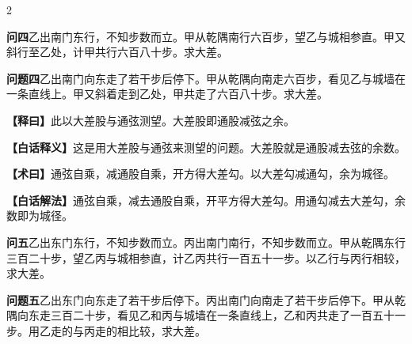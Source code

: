 \documentclass[11pt,a4paper]{article}
\newcommand{\WenQuestion}[1]{\textbf{\textcolor{classicalcolor}{#1}}}
\newcommand{\BaiQuestion}[1]{\textbf{\textcolor{moderncolor}{#1}}}
\newcommand{\WenExplain}{\textcolor{classicalcolor}{\textbf{【释曰】}}}
\newcommand{\BaiExplain}{\textcolor{moderncolor}{\textbf{【白话释义】}}}
\newcommand{\WenMethod}{\textcolor{classicalcolor}{\textbf{【术曰】}}}
\newcommand{\BaiMethod}{\textcolor{moderncolor}{\textbf{【白话解法】}}}
\begin{document}
\vspace{0.5em}

\begin{paracol}{2}

\switchcolumn*
\begin{tcolorbox}[colback=red!3,colframe=red!30!black,boxrule=0.3pt]
\WenQuestion{问四}\quad 乙出南门东行，不知步数而立。甲从乾隅南行六百步，望乙与城相参直。甲又斜行至乙处，计甲共行六百八十步。求大差。
\end{tcolorbox}
\switchcolumn
\begin{tcolorbox}[colback=blue!3,colframe=blue!30!black,boxrule=0.3pt]
\BaiQuestion{问题四}\quad 乙出南门向东走了若干步后停下。甲从乾隅向南走六百步，看见乙与城墙在一条直线上。甲又斜着走到乙处，甲共走了六百八十步。求大差。
\end{tcolorbox}

\switchcolumn*
\begin{tcolorbox}[colback=red!5,colframe=red!30!black,boxrule=0.3pt]
\WenExplain\quad 此以大差股与通弦测望。大差股即通股减弦之余。
\end{tcolorbox}
\switchcolumn
\begin{tcolorbox}[colback=blue!5,colframe=blue!30!black,boxrule=0.3pt]
\BaiExplain\quad 这是用大差股与通弦来测望的问题。大差股就是通股减去弦的余数。
\end{tcolorbox}

\switchcolumn*
\begin{tcolorbox}[colback=red!5,colframe=red!40!black,boxrule=0.3pt]
\WenMethod\quad 通弦自乘，减通股自乘，开方得大差勾。以大差勾减通勾，余为城径。
\end{tcolorbox}
\switchcolumn
\begin{tcolorbox}[colback=blue!5,colframe=blue!40!black,boxrule=0.3pt]
\BaiMethod\quad 通弦自乘，减去通股自乘，开平方得大差勾。用通勾减去大差勾，余数即为城径。
\end{tcolorbox}

\vspace{0.8em}

\switchcolumn*
\begin{tcolorbox}[colback=red!3,colframe=red!30!black,boxrule=0.3pt]
\WenQuestion{问五}\quad 乙出东门东行，不知步数而立。丙出南门南行，不知步数而立。甲从乾隅东行三百二十步，望乙丙与城相参直，计乙丙共行一百五十一步。以乙行与丙行相较，求大差。
\end{tcolorbox}
\switchcolumn
\begin{tcolorbox}[colback=blue!3,colframe=blue!30!black,boxrule=0.3pt]
\BaiQuestion{问题五}\quad 乙出东门向东走了若干步后停下。丙出南门向南走了若干步后停下。甲从乾隅向东走三百二十步，看见乙和丙与城墙在一条直线上，乙和丙共走了一百五十一步。用乙走的与丙走的相比较，求大差。
\end{tcolorbox}


\end{paracol}
\end{document}
